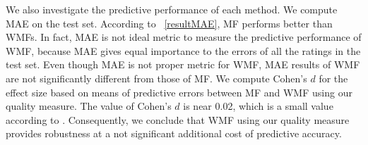 \documentclass[master,english,final]{kaist-ucs}
\begin{document}
We also investigate the predictive performance of each method.
We compute MAE on the test set.
According to ~\ref{resultMAE}, MF performs better than WMFs.
In fact, MAE is not ideal metric to measure the predictive performance of WMF, because MAE gives equal importance to the errors of all the ratings in the test set.
Even though MAE is not proper metric for WMF, MAE results of WMF are not significantly different from those of MF.
We compute Cohen's $d$ for the effect size based on means of predictive errors between MF and WMF using our quality measure.
The value of Cohen's $d$ is near 0.02, which is a small value according to \cite{EffectSize}.
Consequently, we conclude that WMF using our quality measure provides robustness at a not significant additional cost of predictive accuracy.


\end{document}
